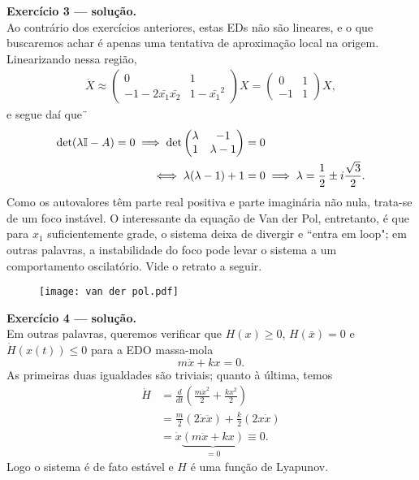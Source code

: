 	\noindent
	\textbf{\sffamily Exercício 3 --- solução.} \\
	Ao contrário dos exercícios anteriores, estas EDs não são lineares, e o que buscaremos achar é apenas uma tentativa de aproximação local na origem. 
	Linearizando nessa região, 
	\begin{align*}
		\dot{X} \approx 
		\begin{pmatrix}
			0 & 1 \\
			-1 - 2\bar{x_1}\bar{x_2} & 1-\bar{x_1}^2
		\end{pmatrix}
		X
		=
		\begin{pmatrix}
			 0 & 1 \\
			-1 & 1
		\end{pmatrix}
		X,
	\end{align*}
	e segue daí que¨
	\begin{align*}
		\det(\lambda\mathbb{I} - A) = 0 \implies 
		\det
		\begin{pmatrix}
			\lambda & -1 \\
			1 & \lambda-1
		\end{pmatrix}
		&= 0 \\
		\iff
		\lambda(\lambda-1) + 1 &= 0
		\implies 
		\lambda = \frac{1}{2} \pm i\frac{\sqrt{3}}{2}.
	\end{align*}
	Como os autovalores têm parte real positiva e parte imaginária não nula, trata-se de um foco instável. 
	O interessante da equação de Van der Pol, entretanto, é que para $x_1$ suficientemente grade, o sistema deixa de divergir e ``entra em loop"; 
	em outras palavras, a instabilidade do foco pode levar o sistema a um comportamento oscilatório. 
	Vide o retrato a seguir.
	\begin{figure}[H]\centering
		\texttt{[image: van der pol.pdf]}
	\end{figure}
	
	\noindent
	\textbf{\sffamily Exercício 4 --- solução.} \\
	Em outras palavras, queremos verificar que 
	$H(x)\geq 0$, 
	$H(\bar{x})=0$ e 
	$\dot{H}(x(t)) \leq 0$ para a EDO massa-mola 
	\[
		m\ddot{x} + kx = 0.
	\]
	As primeiras duas igualdades são triviais; quanto à última, temos 
	\begin{align*}
		\dot{H} &= \frac{d}{dt} \left(
		               \frac{m\dot{x}^2}{2} + 
		               \frac{kx^2}{2}
		           \right) \\
		        &= \frac{m}{2} (2\dot{x}\ddot{x}) +
		           \frac{k}{2} (2x\dot{x}) \\
		        &= \dot{x}
		           \underbrace{(m\ddot{x} + kx)}_{=0} 
		        \equiv 0.
	\end{align*} 
	Logo o sistema é de fato estável e $H$ é uma função de Lyapunov. \\
	
